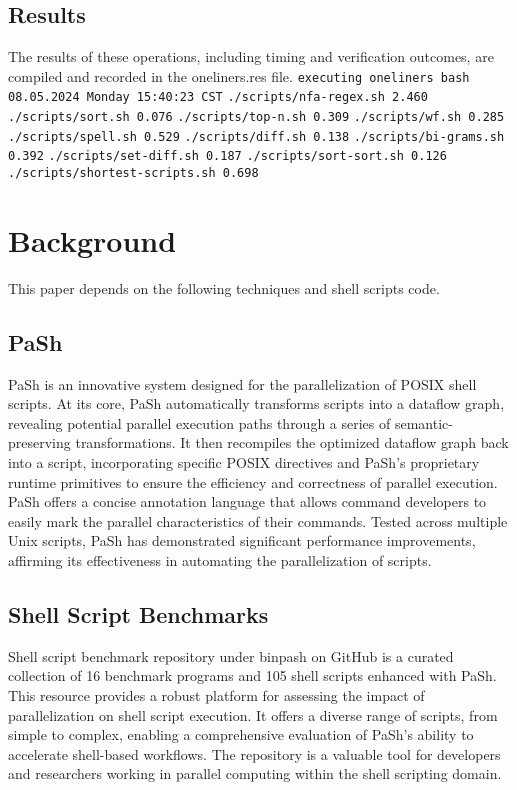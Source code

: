 \documentclass[sigplan, screen, 10pt]{acmart}
\begin{document}
\subsection{Results}
The results of these operations, including timing and verification outcomes, are compiled and recorded in the oneliners.res file.\newline
\texttt{executing oneliners bash 08.05.2024 Monday 15:40:23 CST}
\texttt{./scripts/nfa-regex.sh 2.460} \newline
\texttt{./scripts/sort.sh 0.076}\newline
\texttt{./scripts/top-n.sh 0.309}\newline
\texttt{./scripts/wf.sh 0.285}\newline
\texttt{./scripts/spell.sh 0.529}\newline
\texttt{./scripts/diff.sh 0.138}\newline
\texttt{./scripts/bi-grams.sh 0.392}\newline
\texttt{./scripts/set-diff.sh 0.187}\newline
\texttt{./scripts/sort-sort.sh 0.126}\newline
\texttt{./scripts/shortest-scripts.sh 0.698}

\section{Background}
\label{bg}
This paper depends on the following techniques and shell scripts code.
\subsection{PaSh}
PaSh\cite{vasilakis2021pash} is an innovative system designed for the parallelization of POSIX shell scripts.
At its core, PaSh automatically transforms scripts into a dataflow graph, revealing potential parallel execution paths through a series of semantic-preserving transformations.
It then recompiles the optimized dataflow graph back into a script, incorporating specific POSIX directives and PaSh's proprietary runtime primitives to ensure the efficiency and correctness of parallel execution.
PaSh offers a concise annotation language that allows command developers to easily mark the parallel characteristics of their commands. 
Tested across multiple Unix scripts, PaSh has demonstrated significant performance improvements, affirming its effectiveness in automating the parallelization of scripts.
\subsection{Shell Script Benchmarks}
Shell script benchmark\cite{binpashbenchmark} repository under binpash on GitHub is a curated collection of 16 benchmark programs and 105 shell scripts enhanced with PaSh. 
This resource provides a robust platform for assessing the impact of parallelization on shell script execution. 
It offers a diverse range of scripts, from simple to complex, enabling a comprehensive evaluation of PaSh's ability to accelerate shell-based workflows.
The repository is a valuable tool for developers and researchers working in parallel computing within the shell scripting domain.\newline
\end{document}
